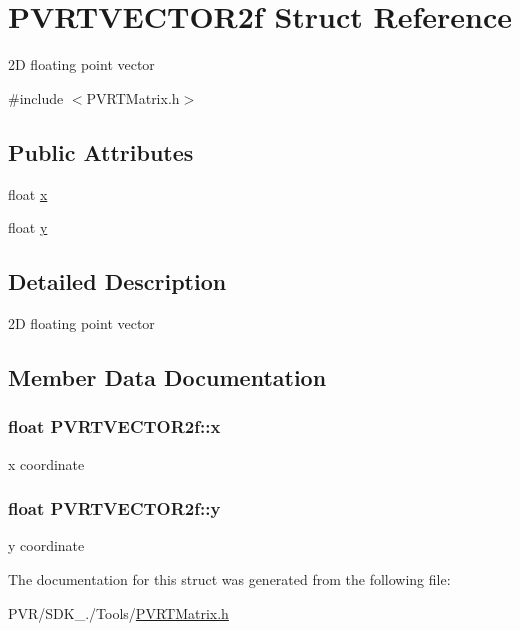 \hypertarget{struct_p_v_r_t_v_e_c_t_o_r2f}{\section{P\+V\+R\+T\+V\+E\+C\+T\+O\+R2f Struct Reference}
\label{struct_p_v_r_t_v_e_c_t_o_r2f}
}


2\+D floating point vector  




{\ttfamily \#include $<$P\+V\+R\+T\+Matrix.\+h$>$}

\subsection*{Public Attributes}
\begin{DoxyCompactItemize}
\item 
float \hyperlink{struct_p_v_r_t_v_e_c_t_o_r2f_aee60bae3010d9514694e2da777d58b8f}{x}
\item 
float \hyperlink{struct_p_v_r_t_v_e_c_t_o_r2f_a2eaf3f8ffc8ad351d1702708dfd02dbe}{y}
\end{DoxyCompactItemize}


\subsection{Detailed Description}
2\+D floating point vector 



 

\subsection{Member Data Documentation}
\hypertarget{struct_p_v_r_t_v_e_c_t_o_r2f_aee60bae3010d9514694e2da777d58b8f}{
\subsubsection[{x}]{\setlength{\rightskip}{0pt plus 5cm}float P\+V\+R\+T\+V\+E\+C\+T\+O\+R2f\+::x}}\label{struct_p_v_r_t_v_e_c_t_o_r2f_aee60bae3010d9514694e2da777d58b8f}
x coordinate \hypertarget{struct_p_v_r_t_v_e_c_t_o_r2f_a2eaf3f8ffc8ad351d1702708dfd02dbe}{
\subsubsection[{y}]{\setlength{\rightskip}{0pt plus 5cm}float P\+V\+R\+T\+V\+E\+C\+T\+O\+R2f\+::y}}\label{struct_p_v_r_t_v_e_c_t_o_r2f_a2eaf3f8ffc8ad351d1702708dfd02dbe}
y coordinate 

The documentation for this struct was generated from the following file\+:\begin{DoxyCompactItemize}
\item 
P\+V\+R/\+S\+D\+K\+\_./\+Tools/\hyperlink{_p_v_r_t_matrix_8h}{P\+V\+R\+T\+Matrix.\+h}\end{DoxyCompactItemize}
